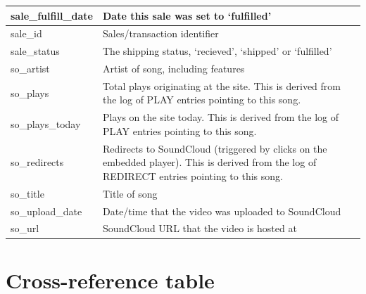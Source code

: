 \documentclass[11pt, a4paper]{report}
\begin{document}
\begin{longtable}{|l|p{10cm}|}
sale\_fulfill\_date     & Date this sale was set to `fulfilled'                                                                                                                                 \\ \hline
sale\_id                & Sales/transaction identifier                                                                                                                                          \\ \hline
sale\_status            & The shipping status, `recieved', `shipped' or `fulfilled'                                                                                                             \\ \hline
so\_artist              & Artist of song, including features                                                                                                                                    \\ \hline
so\_plays               & Total plays originating at the site. This is derived from the log of PLAY entries pointing to this song.                                                              \\ \hline
so\_plays\_today        & Plays on the site today. This is derived from the log of PLAY entries pointing to this song.                                                                          \\ \hline
so\_redirects           & Redirects to SoundCloud (triggered by clicks on the embedded player). This is derived from the log of REDIRECT entries pointing to this song.                         \\ \hline
so\_title               & Title of song                                                                                                                                                         \\ \hline
so\_upload\_date        & Date/time that the video was uploaded to SoundCloud                                                                                                                   \\ \hline
so\_url                 & SoundCloud URL that the video is hosted at                                                                                                                            \\ \hline

\end{longtable}


\clearpage
\section{Cross-reference table}
\end{document}

